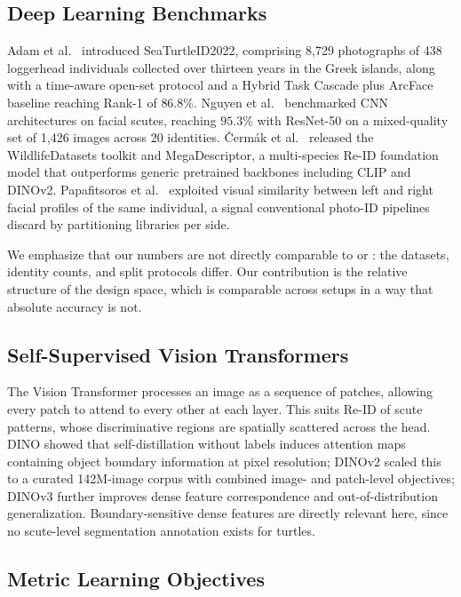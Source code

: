 \documentclass[conference]{IEEEtran}
\begin{document}
\subsection{Deep Learning Benchmarks}

Adam et al.\ \cite{adam2023} introduced SeaTurtleID2022, comprising 8{,}729 photographs
of 438 loggerhead individuals collected over thirteen years in the Greek islands, along
with a time-aware open-set protocol and a Hybrid Task Cascade plus ArcFace baseline
reaching Rank-1 of $86.8\%$. Nguyen et al.\ \cite{nguyen2023} benchmarked CNN
architectures on facial scutes, reaching $95.3\%$ with ResNet-50 on a mixed-quality set
of 1{,}426 images across 20 identities. \v{C}erm\'{a}k et al.\ \cite{cermak2024}
released the WildlifeDatasets toolkit and MegaDescriptor, a multi-species Re-ID
foundation model that outperforms generic pretrained backbones including CLIP and
DINOv2. Papafitsoros et al.\ \cite{papafitsoros2025} exploited visual similarity
between left and right facial profiles of the same individual, a signal conventional
photo-ID pipelines discard by partitioning libraries per side.

We emphasize that our numbers are not directly comparable to \cite{adam2023} or
\cite{nguyen2023}: the datasets, identity counts, and split protocols differ. Our
contribution is the relative structure of the design space, which is comparable across
setups in a way that absolute accuracy is not.

\subsection{Self-Supervised Vision Transformers}

The Vision Transformer \cite{dosovitskiy2021} processes an image as a sequence of
patches, allowing every patch to attend to every other at each layer. This suits Re-ID
of scute patterns, whose discriminative regions are spatially scattered across the
head. DINO \cite{caron2021} showed that self-distillation without labels induces
attention maps containing object boundary information at pixel resolution; DINOv2
\cite{oquab2024} scaled this to a curated 142M-image corpus with combined image- and
patch-level objectives; DINOv3 \cite{simeoni2025} further improves dense feature
correspondence and out-of-distribution generalization. Boundary-sensitive dense
features are directly relevant here, since no scute-level segmentation annotation
exists for turtles.

\subsection{Metric Learning Objectives}
\end{document}
